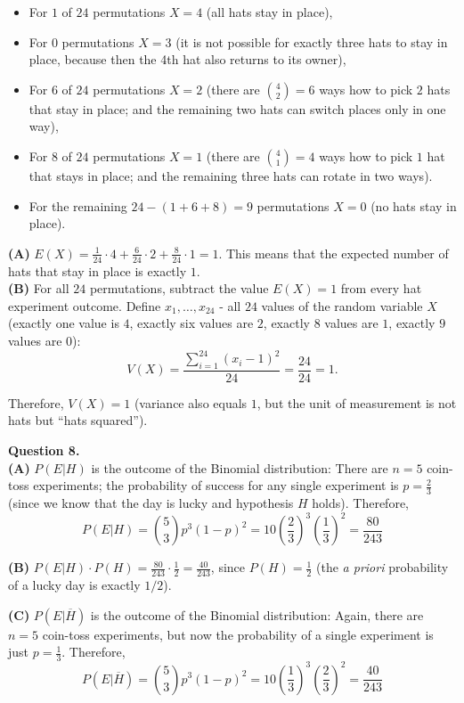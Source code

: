 \documentclass[jou]{apa6}
\begin{document}
\begin{itemize}
\item For $1$ of $24$ permutations $X = 4$ (all hats stay in place),
\item For $0$ permutations $X = 3$ (it is not possible for exactly three hats to stay in place, because
then the 4th hat also returns to its owner),
\item For $6$ of $24$ permutations $X = 2$ (there are ${4 \choose 2} = 6$ ways how to pick $2$ hats
that stay in place; and the remaining two hats can switch places only in one way),
\item For $8$ of $24$ permutations $X = 1$ (there are ${4 \choose 1} = 4$ ways how to pick $1$ hat
that stays in place; and the remaining three hats can rotate in two ways). 
\item For the remaining $24 - (1 + 6 + 8) = 9$ permutations $X = 0$ (no hats stay in place).
\end{itemize}


{\bf (A)} $E(X) = \frac{1}{24} \cdot 4 + \frac{6}{24} \cdot 2 + \frac{8}{24} \cdot 1 = 1$. 
This means that the expected number of hats that stay in place is exactly $1$.\\
{\bf (B)} For all $24$ permutations, subtract the value $E(X) = 1$ from 
every hat experiment outcome. Define $x_1,\ldots,x_{24}$ - all $24$ values of the 
random variable $X$ (exactly one value is $4$, exactly six values are $2$, 
exactly $8$ values are $1$, exactly $9$ values are $0$): 
$$V(X) = \frac{\sum_{i=1}^{24} (x_i - 1)^2}{24} = \frac{24}{24} = 1.$$

Therefore, $V(X) = 1$ (variance also equals $1$, but the unit of measurement 
is not hats but ``hats squared''). 


\vspace{10pt}
{\bf Question 8.} \\

{\bf (A)} $P(E|H)$ is the outcome of the Binomial distribution: 
There are $n=5$ coin-toss experiments; the probability of success for any single experiment 
is $p = \frac{2}{3}$ (since we know that the day is lucky and hypothesis $H$ holds). 
Therefore, 
$$P(E|H) = {5 \choose 3} p^3 (1-p)^2 = 10 \left( \frac{2}{3} \right)^3 \left( \frac{1}{3} \right)^2 = 
\frac{80}{243}$$

{\bf (B)} $P(E|H)\cdot P(H) = \frac{80}{243}\cdot\frac{1}{2}= \frac{40}{243}$, 
since $P(H) = \frac{1}{2}$ (the {\em a priori} probability of a lucky day is exactly $1/2$). 

{\bf (C)} $P(E|\overline{H})$ is the outcome of the Binomial distribution: 
Again, there are $n=5$ coin-toss experiments, but now the probability of a single
experiment is just $p = \frac{1}{3}$. Therefore, 
$$P(E|\overline{H}) = {5 \choose 3} p^3 (1-p)^2 = 10 \left( \frac{1}{3} \right)^3 \left( \frac{2}{3} \right)^2 = 
\frac{40}{243}$$
\end{document}
